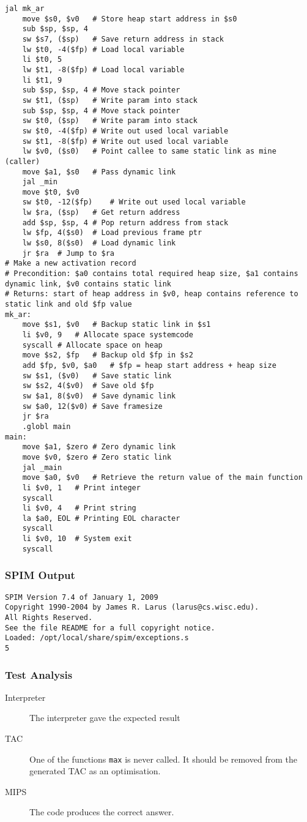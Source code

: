 \begin{lstlisting}[showstringspaces=false,breaklines=true,backgroundcolor=\color{light-gray}, captionpos=b]
	jal mk_ar
	move $s0, $v0	# Store heap start address in $s0
	sub $sp, $sp, 4
	sw $s7, ($sp)	# Save return address in stack
	lw $t0, -4($fp)	# Load local variable
	li $t0, 5
	lw $t1, -8($fp)	# Load local variable
	li $t1, 9
	sub $sp, $sp, 4	# Move stack pointer
	sw $t1, ($sp)	# Write param into stack
	sub $sp, $sp, 4	# Move stack pointer
	sw $t0, ($sp)	# Write param into stack
	sw $t0, -4($fp)	# Write out used local variable
	sw $t1, -8($fp)	# Write out used local variable
	lw $v0, ($s0)	# Point callee to same static link as mine (caller)
	move $a1, $s0	# Pass dynamic link
	jal _min
	move $t0, $v0
	sw $t0, -12($fp)	# Write out used local variable
	lw $ra, ($sp)	# Get return address
	add $sp, $sp, 4	# Pop return address from stack
	lw $fp, 4($s0)	# Load previous frame ptr
	lw $s0, 8($s0)	# Load dynamic link
	jr $ra	# Jump to $ra
# Make a new activation record
# Precondition: $a0 contains total required heap size, $a1 contains dynamic link, $v0 contains static link
# Returns: start of heap address in $v0, heap contains reference to static link and old $fp value
mk_ar:
	move $s1, $v0	# Backup static link in $s1
	li $v0, 9	# Allocate space systemcode
	syscall	# Allocate space on heap
	move $s2, $fp	# Backup old $fp in $s2
	add $fp, $v0, $a0	# $fp = heap start address + heap size
	sw $s1, ($v0)	# Save static link
	sw $s2, 4($v0)	# Save old $fp
	sw $a1, 8($v0)	# Save dynamic link
	sw $a0, 12($v0)	# Save framesize
	jr $ra
	.globl main
main:
	move $a1, $zero	# Zero dynamic link
	move $v0, $zero	# Zero static link
	jal _main
	move $a0, $v0	# Retrieve the return value of the main function
	li $v0, 1	# Print integer
	syscall
	li $v0, 4	# Print string
	la $a0, EOL	# Printing EOL character
	syscall
	li $v0, 10	# System exit
	syscall

\end{lstlisting}\subsubsection{SPIM Output}
\begin{verbatim}
SPIM Version 7.4 of January 1, 2009
Copyright 1990-2004 by James R. Larus (larus@cs.wisc.edu).
All Rights Reserved.
See the file README for a full copyright notice.
Loaded: /opt/local/share/spim/exceptions.s
5
\end{verbatim}
\subsubsection{Test Analysis}
\begin{description}
	\item[Interpreter] The interpreter gave the expected result
	\item[TAC] One of the functions \verb!max! is never called. It should be removed from the generated TAC as an optimisation.
	\item[MIPS] The code produces the correct answer.
\end{description}